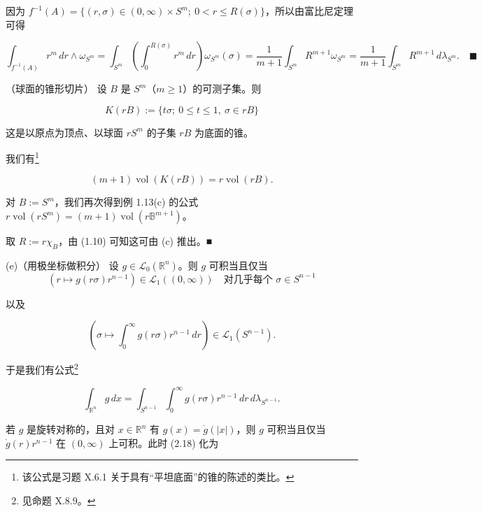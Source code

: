 \begin{example}
因为 $ f^{-1}(A) = \{ (r,\sigma) \in (0,\infty) \times S^m ;\ 0 < r \le R(\sigma) \} $，所以由富比尼定理可得

\[
\int_{f^{-1}(A)} r^m\,dr \wedge \omega_{S^m} = \int_{S^m} \left( \int_0^{R(\sigma)} r^m\,dr \right)\omega_{S^m}(\sigma) = \frac{1}{m+1} \int_{S^m} R^{m+1}\omega_{S^m} = \frac{1}{m+1} \int_{S^m} R^{m+1}\,d\lambda_{S^m} .\quad\blacksquare
\]

\begin{items}
\item[（d）]

（球面的锥形切片） 设 $ B $ 是 $ S^m $（$ m \ge 1 $）的可测子集。则

\[
K(rB) := \{ t\sigma ;\ 0 \le t \le 1,\ \sigma \in rB \}
\]

这是以原点为顶点、以球面 $ rS^m $ 的子集 $ rB $ 为底面的锥。

\end{items}


我们有\footnote{该公式是习题 X.6.1 关于具有“平坦底面”的锥的陈述的类比。}

\[
(m+1)\operatorname{vol}(K(rB)) = r\operatorname{vol}(rB) .
\]

对 $ B := S^m $，我们再次得到例 1.13(c) 的公式 $ r\operatorname{vol}(rS^m) = (m+1)\operatorname{vol}(r\mathbb{B}^{m+1}) $。

\proofhead
取 $ R := r\chi_B $，由 (1.10) 可知这可由 (c) 推出。\nobreak\hspace{0.35em}■

(e)（用极坐标做积分） 设 $ g \in \mathcal{L}_0(\mathbb{R}^n) $。则 $ g $ 可积当且仅当
\[
(r \mapsto g(r\sigma)r^{n-1}) \in \mathcal{L}_1((0,\infty)) \quad \text{对几乎每个 } \sigma \in S^{n-1}
\]

以及

\[
\left(\sigma \mapsto \int_0^\infty g(r\sigma)r^{n-1}\,dr\right) \in \mathcal{L}_1(S^{n-1}) .
\]

于是我们有公式\footnote{见命题 X.8.9。}

\begin{equation}
\int_{\mathbb{R}^n} g\,dx = \int_{S^{n-1}}\int_0^\infty g(r\sigma)r^{n-1}\,dr\,d\lambda_{S^{n-1}} .\tag{2.18}
\end{equation}

若 $ g $ 是旋转对称的，且对 $ x \in \mathbb{R}^n $ 有 $ g(x) = \dot{g}(|x|) $，则 $ g $ 可积当且仅当 $ \dot{g}(r)r^{n-1} $ 在 $ (0,\infty) $ 上可积。此时 (2.18) 化为


\end{example}
